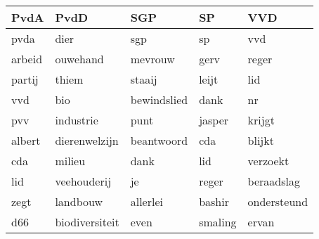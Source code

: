 \begin{tabular}{lllll}
\toprule
   PvdA &            PvdD &          SGP &       SP &          VVD \\
\midrule
   pvda &            dier &          sgp &       sp &          vvd \\
 arbeid &        ouwehand &      mevrouw &     gerv &        reger \\
 partij &           thiem &       staaij &    leijt &          lid \\
    vvd &             bio &  bewindslied &     dank &           nr \\
    pvv &       industrie &         punt &   jasper &       krijgt \\
 albert &   dierenwelzijn &   beantwoord &      cda &       blijkt \\
    cda &          milieu &         dank &      lid &     verzoekt \\
    lid &     veehouderij &           je &    reger &   beraadslag \\
   zegt &        landbouw &     allerlei &   bashir &  ondersteund \\
    d66 &  biodiversiteit &         even &  smaling &        ervan \\
\bottomrule
\end{tabular}
